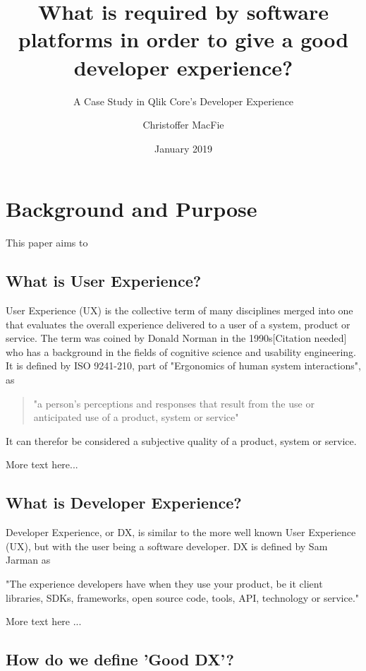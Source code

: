 \documentclass{article}
\title{What is required by software platforms in order to give a good developer experience?}
\subtitle{A Case Study in Qlik Core's Developer Experience}
\author{Christoffer MacFie}
\date{January 2019}
\begin{document}
\maketitle
\newpage
\tableofcontents
\newpage

\section{Background and Purpose}

This paper aims to

\subsection{What is User Experience?}

User Experience (UX) is the collective term of many disciplines merged
into one that evaluates the overall experience delivered to a user of a
system, product or service. The term was coined by Donald Norman in the
1990s[Citation needed] who has a background in the fields of cognitive
science and usability engineering. It is defined by ISO 9241-210, part
of "Ergonomics of human system interactions", as \begin{quote}
"a person's perceptions and responses that result from the use or anticipated use of
a product, system or service"
\end{quote}
It can therefor be considered a
subjective quality of a product, system or service.

More text here...
\subsection{What is Developer Experience?}

Developer Experience, or DX, is similar to the more well known User
Experience (UX), but with the user being a software developer. DX is
defined by Sam Jarman as

\begin{displayquote}
"The experience developers have when they use your product, be it
client libraries, SDKs, frameworks, open source code, tools, API,
technology or service."\cite{jarman}
\end{displayquote}

More text here ...


\subsection{How do we define 'Good DX'?}
\end{document}
